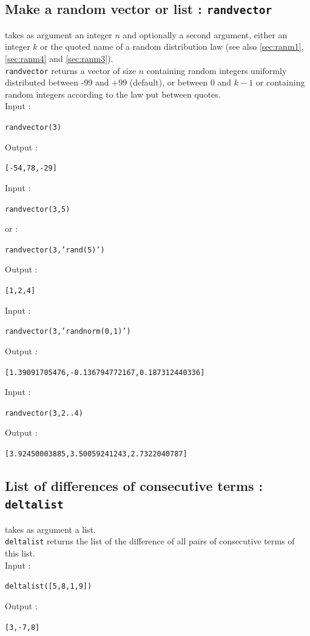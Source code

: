 \documentclass[a4paper,11pt]{book}
\begin{document}
\subsection{Make a random vector or list  : {\tt randvector}}
\label{sec:ranm4}
 takes as argument an integer $n$ and optionally a 
second argument, either an integer $k$ or the quoted name of
a random distribution law
(see also \ref{sec:ranm1}, \ref{sec:ranm4} and \ref{sec:ranm3}).\\
{\tt randvector} returns a vector of size $n$ containing random integers 
uniformly distributed between -99 and +99 (default), or between 0 and $k-1$
or containing random 
integers according to the law put between quotes.\\
Input :
\begin{center}{\tt randvector(3)}\end{center}
Output :
\begin{center}{\tt [-54,78,-29]}\end{center}
Input :
\begin{center}{\tt randvector(3,5)}\end{center}
or :
\begin{center}{\tt randvector(3,'rand(5)')}\end{center}
Output :
\begin{center}{\tt [1,2,4]}\end{center}
Input :
\begin{center}{\tt randvector(3,'randnorm(0,1)')}\end{center}
Output :
\begin{center}{\tt [1.39091705476,-0.136794772167,0.187312440336]}\end{center}
Input :
\begin{center}{\tt randvector(3,2..4)}\end{center}
Output :
\begin{center}{\tt [3.92450003885,3.50059241243,2.7322040787]}\end{center}

\subsection{List of differences of consecutive terms  : {\tt deltalist}}
 takes as argument a list.\\
{\tt deltalist} returns the list of the difference of all 
pairs of consecutive terms of this list.\\
Input :
\begin{center}{\tt deltalist([5,8,1,9])}\end{center}
Output :
\begin{center}{\tt [3,-7,8]}\end{center}
\end{document}
